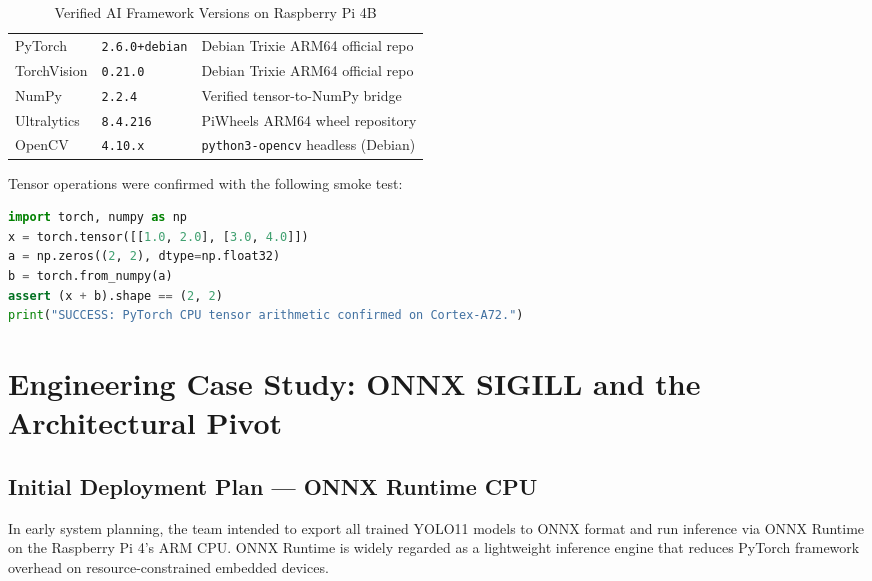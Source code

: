 \documentclass[12pt,a4paper]{article}
\begin{document}
\renewcommand{\arraystretch}{1.30}
\begin{table}[H]
\centering
\caption{Verified AI Framework Versions on Raspberry Pi 4B}
\label{tab:py_packages}
\small
\begin{tabularx}{\linewidth}{@{} L{3.2cm} L{3.0cm} X @{}}
\toprule
{} &  &  \\
\midrule
{}
PyTorch      & \texttt{2.6.0+debian} & Debian Trixie ARM64 official repo \\
TorchVision  & \texttt{0.21.0}       & Debian Trixie ARM64 official repo \\
NumPy        & \texttt{2.2.4}        & Verified tensor-to-NumPy bridge \\
Ultralytics  & \texttt{8.4.216}      & PiWheels ARM64 wheel repository \\
OpenCV       & \texttt{4.10.x}       & \texttt{python3-opencv} headless (Debian) \\
\bottomrule
\end{tabularx}
\end{table}

Tensor operations were confirmed with the following smoke test:
\begin{lstlisting}[language=python, caption={CPU tensor verification on Cortex-A72}]
import torch, numpy as np
x = torch.tensor([[1.0, 2.0], [3.0, 4.0]])
a = np.zeros((2, 2), dtype=np.float32)
b = torch.from_numpy(a)
assert (x + b).shape == (2, 2)
print("SUCCESS: PyTorch CPU tensor arithmetic confirmed on Cortex-A72.")
\end{lstlisting}

\clearpage

\section{Engineering Case Study: ONNX SIGILL and the Architectural Pivot}

\subsection{Initial Deployment Plan --- ONNX Runtime CPU}

In early system planning, the team intended to export all trained YOLO11 models to ONNX
format and run inference via ONNX Runtime on the Raspberry Pi 4's ARM CPU. ONNX Runtime
is widely regarded as a lightweight inference engine that reduces PyTorch framework
overhead on resource-constrained embedded devices.
\end{document}

